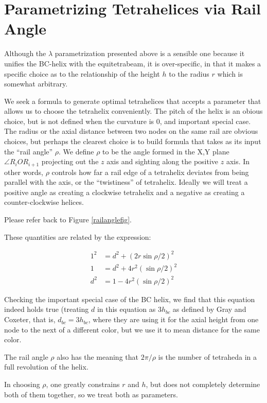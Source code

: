 \documentclass[11pt]{article}
\begin{document}
\section{Parametrizing Tetrahelices via Rail Angle}

Although the $\lambda$ parametrization presented above is a sensible one
because it unifies the BC-helix with the equitetrabeam, it is over-specific,
in that it makes a specific choice as to the relationship of the height $h$
to the radius $r$ which is somewhat arbitrary.

We seek a formula to generate optimal tetrahelices that accepts a
parameter that allows us to choose the tetrahelix conveniently. The
pitch of the helix is an obious choice, but is not defined when the
curvature is $0$, and important special case. The radius or the axial
distance between two nodes on the same rail are obvious choices, but
perhaps the clearest choice is to build formula that takes as its
input the ``rail angle'' $\rho$. We define $\rho$ to be the angle
formed in the X,Y plane $\angle R_i O R_{i+1}$ projecting out the $z$
axis and sighting along the positive $z$ axis. In other words, $\rho$
controls how far a rail edge of a tetrahelix deviates from being
parallel with the axis, or the ``twistiness'' of tetrahelix. Ideally
we will treat a positive angle as creating a clockwise tetrahelix and
a negative as creating a counter-clockwise helices.

Please refer back to Figure \ref{railanglefig}.

 These quantities are related by the expression:

\begin{align*}
  1^2 &= d^2 + (2 r \sin{ \rho / 2})^2 \\
  1 &= d^2 + 4 r^2 (\sin{ \rho / 2})^2 \\
  d^2 &= 1 - 4 r^2 (\sin{ \rho / 2})^2   
\end{align*}

Checking the important special case of the BC helix, we find that this equation
indeed holds true (treating $d$ in this equation as $3 h_{bc}$ as defined by
Gray and Coxeter, that is, $d_{bc} = 3h_{bc}$, where they are using it for the axial height from one node to
the next of a different color, but we use it to mean distance for the same color.

The rail angle $\rho$ also has the meaning that $2 \pi / \rho$ is the number of
tetraheda in a full revolution of the helix.

In choosing $\rho$, one greatly constrains $r$ and $h$, but does not completely
determine both of them together, so we treat both as parameters.
\end{document}
